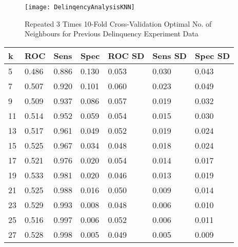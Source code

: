 \begin{figure}[H]
	\texttt{[image: DelinqencyAnalysisKNN]}
	\caption{Repeated 3 Times 10-Fold Cross-Validation Optimal No. of Neighbours for Previous Delinquency Experiment Data}
	\label{fig:DelinqencyAnalysisKNN}
\end{figure}



{\footnotesize
	\begin{longtable}
		{l|l|l|l|l|l|l}
		\hline
		\textbf{k} & \textbf{ROC} & \textbf{Sens} & \textbf{Spec} & \textbf{ROC SD} & \textbf{Sens SD} & \textbf{Spec SD} \\ \hline
		5          & 0.486        & 0.886         & 0.130         & 0.053           & 0.030            & 0.043            \\
		7          & 0.507        & 0.920         & 0.101         & 0.060           & 0.023            & 0.049            \\
		9          & 0.509        & 0.937         & 0.086         & 0.057           & 0.019            & 0.032            \\
		11         & 0.514        & 0.952         & 0.059         & 0.054           & 0.015            & 0.030            \\
		13         & 0.517        & 0.961         & 0.049         & 0.052           & 0.019            & 0.024            \\
		15         & 0.525        & 0.967         & 0.034         & 0.048           & 0.018            & 0.024            \\
		17         & 0.521        & 0.976         & 0.020         & 0.054           & 0.014            & 0.017            \\
		19         & 0.533        & 0.981         & 0.020         & 0.046           & 0.013            & 0.019            \\
		21         & 0.525        & 0.988         & 0.016         & 0.050           & 0.009            & 0.014            \\
		23         & 0.529        & 0.993         & 0.008         & 0.048           & 0.006            & 0.010            \\
		25         & 0.516        & 0.997         & 0.006         & 0.052           & 0.006            & 0.011            \\
		27         & 0.528        & 0.998         & 0.005         & 0.049           & 0.005            & 0.009            \\

\end{longtable}}
